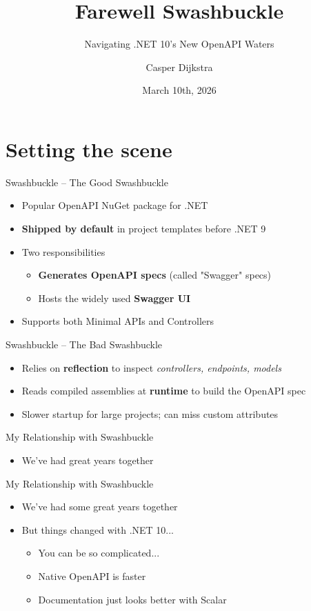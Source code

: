 \documentclass{beamer}
\title{Farewell Swashbuckle}
\subtitle{Navigating .NET 10’s New OpenAPI Waters}
\author{Casper Dijkstra}
\date{March 10th, 2026}
\begin{document}

\titlepagecustomWithPicture

\section{Setting the scene}

\begin{frame}{Swashbuckle – The Good 
}
Swashbuckle
\begin{itemize}
    \item Popular OpenAPI NuGet package for .NET
    \item \textbf{Shipped by default} in project templates before .NET 9
    \pause
    \item Two responsibilities
    \begin{itemize}
        \item \textbf{Generates OpenAPI specs} (called "Swagger" specs)
        \item Hosts the widely used \textbf{Swagger UI}
    \end{itemize}
    \pause
    \item Supports both Minimal APIs and Controllers 

\end{itemize}
\end{frame}


\begin{frame}{Swashbuckle – The Bad }
Swashbuckle
\begin{itemize}
    \item Relies on \textbf{reflection} to inspect \textit{controllers, endpoints, models}
    \item Reads compiled assemblies at \textbf{runtime} to build the OpenAPI spec
    \item Slower startup for large projects; can miss custom attributes
\end{itemize}
\end{frame}

\begin{frame}[fragile]{My Relationship with Swashbuckle }
\begin{itemize}
    \item We've had great years together
\end{itemize}
\end{frame}

\begin{frame}[fragile]{My Relationship with Swashbuckle }
\begin{itemize}
    \item We've had some great years together
    \item But things changed with .NET 10...
        \begin{itemize}
        \item You can be so complicated...
        \item Native OpenAPI is faster
        \item Documentation just looks better with Scalar
    \end{itemize}
\end{itemize}
\end{frame}
\end{document}
